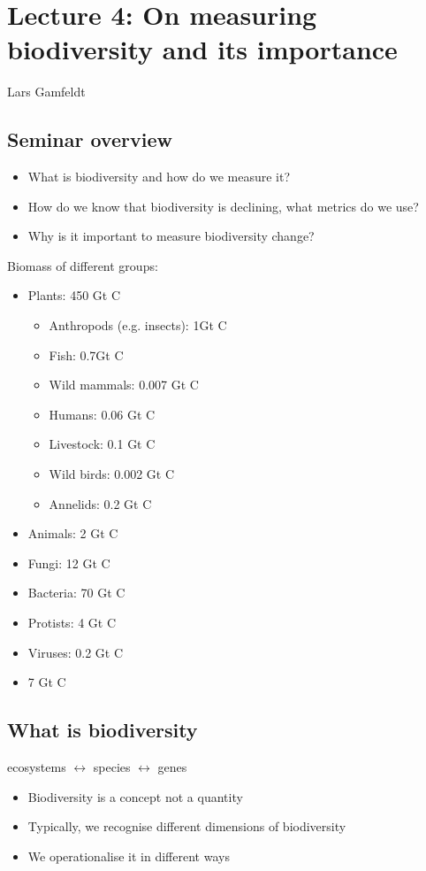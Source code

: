 \section{Lecture 4: On measuring biodiversity and its importance}

Lars Gamfeldt

\subsection{Seminar overview}
\begin{itemize}
	\item What is biodiversity and how do we measure it?
	\item How do we know that biodiversity is declining, what metrics
		do we use?
	\item Why is it important to measure biodiversity change?
\end{itemize}

Biomass of different groups:
\begin{itemize}
	\item Plants: 450 Gt C
		\begin{itemize}
			\item Anthropods (e.g. insects): 1Gt C
			\item Fish: 0.7Gt C
			\item Wild mammals: 0.007 Gt C
			\item Humans: 0.06 Gt C
			\item Livestock: 0.1 Gt C
			\item Wild birds: 0.002 Gt C
			\item Annelids: 0.2 Gt C
		\end{itemize}
	\item Animals: 2 Gt C
	\item Fungi: 12 Gt C
	\item Bacteria: 70 Gt C
	\item Protists: 4 Gt C
	\item Viruses: 0.2 Gt C
	\item 7 Gt C
\end{itemize}

\subsection{What is biodiversity}

ecosystems $\leftrightarrow$ species $\leftrightarrow$ genes


\begin{itemize}
	\item Biodiversity is a concept not a quantity
	\item Typically, we recognise different dimensions of biodiversity
	\item We operationalise it in different ways
\end{itemize}

